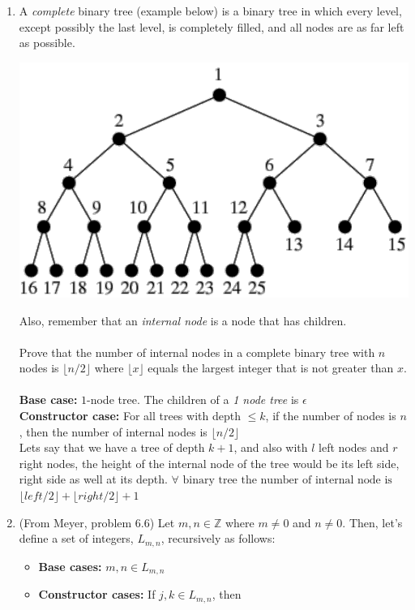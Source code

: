 \documentclass[12pt]{article}
\begin{document}
\begin{enumerate}
\item A \textit{complete} binary tree (example below) is a binary tree in which every level, except possibly the last level, is completely filled, and all nodes are as far left as possible.
\begin{center}
\includegraphics[scale=.3]{CompleteBinaryTree.pdf}
\end{center}
Also, remember that an \textit{internal node} is a node that has children.\\\\
Prove that the number of internal nodes in a complete binary tree with $n$ nodes is $\lfloor n/2 \rfloor$ where $\lfloor x \rfloor$ equals the largest integer that is not greater than $x$. \\\\
\textbf{Base case: } $1$-node tree. The children of a \textit{1 node tree} is $\epsilon$ \\
\textbf{Constructor case: } For all trees with depth $\le k$, if the number of nodes is $n$, then the number of internal nodes is $\lfloor n/2 \rfloor$\\
Lets say that we have a tree of depth $k+1$, and also with $l$ left nodes and $r$ right nodes, the height of the internal node of the tree would be its left side, right side as well at its depth. $\forall \text{ binary tree the number of internal node is }$
$ \lfloor left/2 \rfloor + \lfloor right/2 \rfloor + 1$
\item (From Meyer, problem 6.6) Let $m,n \in \mathbb{Z}$ where $m \not = 0$ and $n \not = 0$. Then, let's define a set of integers, $L_{m,n}$, recursively as follows:
\begin{itemize}
\item \textbf{Base cases:} $m,n \in L_{m,n}$
\item \textbf{Constructor cases:} If $j,k \in L_{m,n}$, then

\end{itemize}
\end{enumerate}
\end{document}
